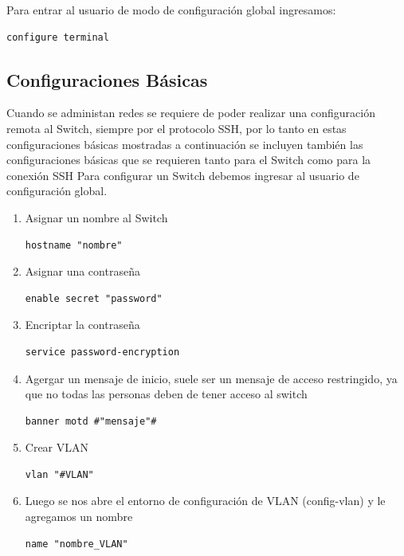\documentclass[journal]{IEEEtran}
\begin{document}
Para entrar al usuario de modo de configuración global ingresamos:
\begin{lstlisting}[frame=single]
configure terminal
\end{lstlisting}

\subsection{\textbf{Configuraciones Básicas}}
Cuando se administan redes se requiere de poder realizar una configuración remota al Switch, siempre por el protocolo SSH, por lo tanto en estas configuraciones básicas mostradas a continuación se incluyen también las configuraciones básicas que se requieren tanto para el Switch como para la conexión SSH
Para configurar un Switch debemos ingresar al usuario de configuración global.
\begin{enumerate}
	
	\item Asignar un nombre al Switch
	\begin{lstlisting}[frame=single]
hostname "nombre"
	\end{lstlisting}
	
	\item Asignar una contraseña
	\begin{lstlisting}[frame=single]
enable secret "password"
	\end{lstlisting}
	
	\item Encriptar la contraseña
	
	\begin{lstlisting}[frame=single]
service password-encryption
	\end{lstlisting}
	
	\item Agergar un mensaje de inicio, suele ser un mensaje de acceso restringido, ya que no todas las personas deben de tener acceso al switch
	\begin{lstlisting}[frame=single]
banner motd #"mensaje"#
	\end{lstlisting}
	
	\item Crear VLAN
	\begin{lstlisting}[frame=single]
vlan "#VLAN"
	\end{lstlisting}
	
	\item Luego se nos abre el entorno de configuración de VLAN (config-vlan) y le agregamos un nombre
	\begin{lstlisting}[frame=single]
name "nombre_VLAN"
	\end{lstlisting}
	

\end{enumerate}
\end{document}
